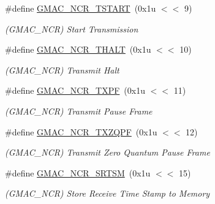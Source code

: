 \begin{DoxyCompactItemize}
\mbox{\label{group__SAMV71__GMAC_gabe6db906a776de0f78a6d89ad1b115dc}} 
\#define \mbox{\hyperlink{group__SAMV71__GMAC_gabe6db906a776de0f78a6d89ad1b115dc}{G\+M\+A\+C\+\_\+\+N\+C\+R\+\_\+\+T\+S\+T\+A\+RT}}~(0x1u $<$$<$ 9)
\begin{DoxyCompactList}\small\item\em (G\+M\+A\+C\+\_\+\+N\+CR) Start Transmission \end{DoxyCompactList}\item 
\mbox{\label{group__SAMV71__GMAC_ga70dd4513f4ba0c993fa8340c199c7501}} 
\#define \mbox{\hyperlink{group__SAMV71__GMAC_ga70dd4513f4ba0c993fa8340c199c7501}{G\+M\+A\+C\+\_\+\+N\+C\+R\+\_\+\+T\+H\+A\+LT}}~(0x1u $<$$<$ 10)
\begin{DoxyCompactList}\small\item\em (G\+M\+A\+C\+\_\+\+N\+CR) Transmit Halt \end{DoxyCompactList}\item 
\mbox{\label{group__SAMV71__GMAC_ga7950fab2162c38ad4c12d09487dd03d5}} 
\#define \mbox{\hyperlink{group__SAMV71__GMAC_ga7950fab2162c38ad4c12d09487dd03d5}{G\+M\+A\+C\+\_\+\+N\+C\+R\+\_\+\+T\+X\+PF}}~(0x1u $<$$<$ 11)
\begin{DoxyCompactList}\small\item\em (G\+M\+A\+C\+\_\+\+N\+CR) Transmit Pause Frame \end{DoxyCompactList}\item 
\mbox{\label{group__SAMV71__GMAC_gae74e45b4d98ecdf2d7b628451cde1977}} 
\#define \mbox{\hyperlink{group__SAMV71__GMAC_gae74e45b4d98ecdf2d7b628451cde1977}{G\+M\+A\+C\+\_\+\+N\+C\+R\+\_\+\+T\+X\+Z\+Q\+PF}}~(0x1u $<$$<$ 12)
\begin{DoxyCompactList}\small\item\em (G\+M\+A\+C\+\_\+\+N\+CR) Transmit Zero Quantum Pause Frame \end{DoxyCompactList}\item 
\mbox{\label{group__SAMV71__GMAC_ga30eaf73d4146ad86ea0214402a27ed48}} 
\#define \mbox{\hyperlink{group__SAMV71__GMAC_ga30eaf73d4146ad86ea0214402a27ed48}{G\+M\+A\+C\+\_\+\+N\+C\+R\+\_\+\+S\+R\+T\+SM}}~(0x1u $<$$<$ 15)
\begin{DoxyCompactList}\small\item\em (G\+M\+A\+C\+\_\+\+N\+CR) Store Receive Time Stamp to Memory \end{DoxyCompactList}\item 
$$
\end{DoxyCompactItemize}
